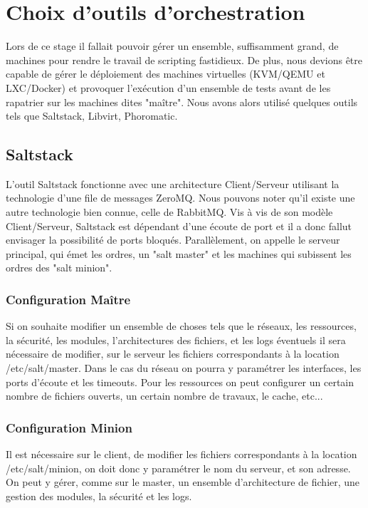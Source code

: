 \section{Choix d'outils d'orchestration}
Lors de ce stage il fallait pouvoir gérer un ensemble, suffisamment grand, de machines pour rendre le travail de scripting fastidieux. De plus, nous devions être capable de gérer le déploiement des machines virtuelles (KVM/QEMU et LXC/Docker) et provoquer l'exécution d'un ensemble de tests avant de les rapatrier sur les machines dites "maître". Nous avons alors utilisé quelques outils tels que Saltstack, Libvirt, Phoromatic.

\subsection{Saltstack}
L'outil Saltstack fonctionne avec une architecture Client/Serveur utilisant la technologie d'une file de messages ZeroMQ. Nous pouvons noter qu'il existe une autre technologie bien connue, celle de RabbitMQ. Vis à vis de son modèle Client/Serveur, Saltstack est dépendant d'une écoute de port et il a donc fallut envisager la possibilité de ports bloqués. Parallèlement, on appelle le serveur principal, qui émet les ordres, un "salt master" et les machines qui subissent les ordres des "salt minion". 

\subsubsection{Configuration Maître}
Si on souhaite modifier un ensemble de choses tels que le réseaux, les ressources, la sécurité, les modules, l'architectures des fichiers, et les logs éventuels il sera nécessaire de modifier, sur le serveur les fichiers correspondants à la location /etc/salt/master. Dans le cas du réseau on pourra y paramétrer les interfaces, les ports d'écoute et les timeouts. Pour les ressources on peut configurer un certain nombre de fichiers ouverts, un certain nombre de travaux, le cache, etc...
 
\subsubsection{Configuration Minion}

Il est nécessaire sur le client, de modifier les fichiers correspondants à la location /etc/salt/minion, on doit donc y paramétrer le nom du serveur, et son adresse. On peut y gérer, comme sur le master, un ensemble d'architecture de fichier, une gestion des modules, la sécurité et les logs.

